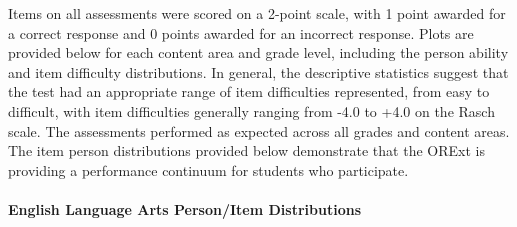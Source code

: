 \documentclass[]{article}
\let\oldparagraph\paragraph
\renewcommand{\paragraph}[1]{\oldparagraph{#1}\mbox{}}
\begin{document}
Items on all assessments were scored on a 2-point scale, with 1 point
awarded for a correct response and 0 points awarded for an incorrect
response. Plots are provided below for each content area and grade
level, including the person ability and item difficulty distributions.
In general, the descriptive statistics suggest that the test had an
appropriate range of item difficulties represented, from easy to
difficult, with item difficulties generally ranging from -4.0 to +4.0 on
the Rasch scale. The assessments performed as expected across all grades
and content areas. The item person distributions provided below
demonstrate that the ORExt is providing a performance continuum for
students who participate.

\hypertarget{english-language-arts-personitem-distributions}{%
\paragraph{English Language Arts Person/Item
Distributions}\label{english-language-arts-personitem-distributions}}

\FloatBarrier
\end{document}
